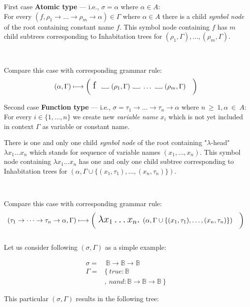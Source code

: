 \documentclass[12pt,a4paper]{report}
\newcommand{\Lets}{Let us\xspace}
\newcommand\Vtextvisiblespace[1][.3em]{%
  \mbox{\kern.06em\vrule height.3ex}%
  \vbox{\hrule width#1}%
  \hbox{\vrule height.3ex}}
\begin{document}
First case \textbf{Atomic type} --- i.e., $\sigma = \alpha$ where $\alpha \in A$:\\
For every $(f,\rho_1 \rightarrow \dots \rightarrow \rho_m \rightarrow \alpha) \in \Gamma$
where $\alpha \in A$ there is a child \textit{symbol node} of the root containing constant name $f$.
This symbol node containing $f$ has $m$ child subtrees corresponding to Inhabitation trees for 
$(\rho_1,\Gamma),\dots,(\rho_m,\Gamma)$.   

~

Compare this case with corresponding grammar rule:
\[ 
	( \alpha , \Gamma )  \longmapsto
	\bigg( \mbox{ {\Large f }}
	  \mbox{ \Vtextvisiblespace[1em] } 
	  ( \rho_1 , \Gamma )
	  \mbox{ \Vtextvisiblespace[1em] } 
	  \dots
	  \mbox{ \Vtextvisiblespace[1em] } 
	  ( \rho_m , \Gamma )
	  \quad \bigg)
\]

Second case \textbf{Function type} --- i.e., 
$\sigma = \tau_1 \rightarrow \dots \rightarrow \tau_n \rightarrow \alpha$
where $n~\geq~1, \alpha~\in~A$:\\
For every  $i \in \{1,\dots,n\}$ we create new \textit{variable name} $x_i$ which is not yet included in context $\Gamma$ as variable or constant name.
 
There is one and only one child \textit{symbol node} of the root containing "$\lambda$-head" 
$\lambda x_1 \dots x_n$ which stands for sequence of variable names $(x_1,\dots,x_n)$.
This symbol node containing $\lambda x_1 \dots x_n$
has one and only one child subtree corresponding to Inhabitation trees for 
$(\alpha,\Gamma \cup \{ (x_1,\tau_1) , \dots , (x_n,\tau_n) \})$.   

~

Compare this case with corresponding grammar rule:
\[ 
	( \tau_1 \rightarrow \dots \rightarrow \tau_n \rightarrow \alpha , \Gamma )  \longmapsto
	\bigg( \mbox{ {\Large 
	$\lambda x_1 \dots x_n .$ 
	}}( \alpha , \Gamma \cup \{ (x_1,\tau_1),\dots,(x_n,\tau_n) \} ) \quad \bigg)
\]
~\\
\Lets consider following $(\sigma,\Gamma)$ as a simple example:

\begin{align*}
\sigma =& ~ \mathbb{B} \rightarrow  \mathbb{B} \rightarrow  \mathbb{B} \\ 
\Gamma =& \{ ~ true : \mathbb{B}  \\
        &  , ~ nand :  \mathbb{B} \rightarrow \mathbb{B} \rightarrow \mathbb{B} ~ \}
\end{align*}

This particular $(\sigma,\Gamma)$ results in the following tree:\\
\end{document}
